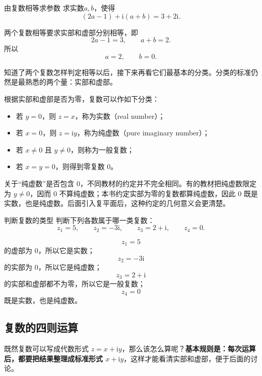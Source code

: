 \begin{lizi}{由复数相等求参数}{}
求实数$a,b$，使得
\begin{equation}
	(2a-1)+\mathrm{i}(a+b)=3+2\mathrm{i}.
\end{equation}

\begin{jie}
两个复数相等要求实部和虚部分别相等，即
\[
2a-1=3,\qquad a+b=2.
\]
所以
\[
a=2,\qquad b=0.
\]
\end{jie}
\end{lizi}


知道了两个复数怎样判定相等以后，接下来再看它们最基本的分类。分类的标准仍然是最熟悉的两个量：实部和虚部。

根据实部和虚部是否为零，复数可以作如下分类：
\begin{itemize}
\item 若 $y=0$，则 $z=x$，称为实数（real number）；
\item 若 $x=0$，则 $z=\mathrm{i}y$，称为纯虚数（pure imaginary number）；
\item 若 $x\neq 0$ 且 $y\neq 0$，则称为一般复数；
\item 若 $x=y=0$，则得到零复数 $0$。
\end{itemize}

\begin{zhu}{}{}
关于``纯虚数''是否包含 $0$，不同教材的约定并不完全相同。有的教材把纯虚数限定为 $y\neq 0$，因而 $0$ 不算纯虚数；本书约定实部为零的复数都算纯虚数，因此 $0$ 既是实数，也是纯虚数。后面引入复平面后，这种约定的几何意义会更清楚。
\end{zhu}

\begin{lizi}{判断复数的类型}{}
判断下列各数属于哪一类复数：
\[
z_1=5,\qquad z_2=-3\mathrm{i},\qquad z_3=2+\mathrm{i},\qquad z_4=0.
\]

\begin{jie}
\[
z_1=5
\]
的虚部为 $0$，所以它是实数；
\[
z_2=-3\mathrm{i}
\]
的实部为 $0$，所以它是纯虚数；
\[
z_3=2+\mathrm{i}
\]
的实部和虚部都不为零，所以它是一般复数；
\[
z_4=0
\]
既是实数，也是纯虚数。
\end{jie}
\end{lizi}

\subsection{复数的四则运算}

既然复数可以写成代数形式 $z=x+\mathrm{i}y$，那么该怎么算呢？\textbf{基本规则是：每次运算后，都要把结果整理成标准形式 $x+\mathrm{i}y$}，这样才能看清实部和虚部，便于后面的讨论。

